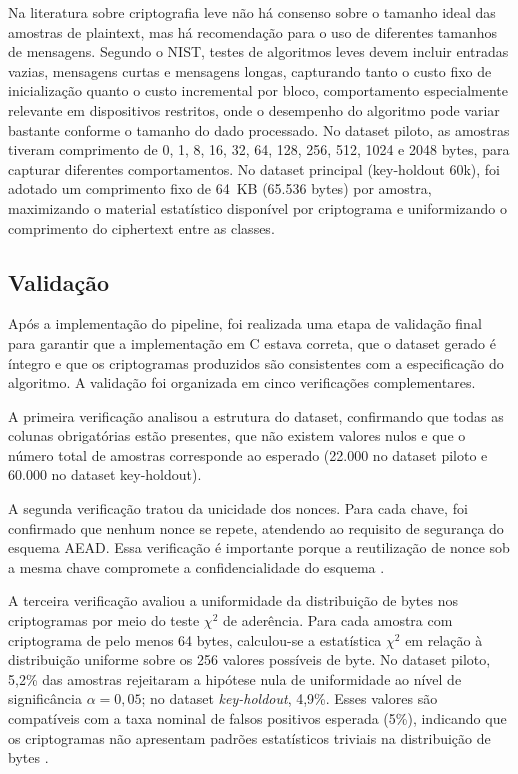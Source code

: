 Na literatura sobre criptografia leve não há consenso sobre o tamanho ideal das amostras de plaintext, mas há recomendação para o uso de diferentes tamanhos de mensagens. Segundo o NIST, testes de algoritmos leves devem incluir entradas vazias, mensagens curtas e mensagens longas, capturando tanto o custo fixo de inicialização quanto o custo incremental por bloco, comportamento especialmente relevante em dispositivos restritos, onde o desempenho do algoritmo pode variar bastante conforme o tamanho do dado processado. No dataset piloto, as amostras tiveram comprimento de 0, 1, 8, 16, 32, 64, 128, 256, 512, 1024 e 2048 bytes, para capturar diferentes comportamentos. No dataset principal (key-holdout 60k), foi adotado um comprimento fixo de 64~KB (65.536 bytes) por amostra, maximizando o material estatístico disponível por criptograma e uniformizando o comprimento do ciphertext entre as classes.
 
\subsection{Validação}
Após a implementação do pipeline, foi realizada uma etapa de validação final para garantir que a implementação em C estava correta, que o dataset gerado é íntegro e que os criptogramas produzidos são consistentes com a especificação do algoritmo. A validação foi organizada em cinco verificações complementares.

A primeira verificação analisou a estrutura do dataset, confirmando que todas as colunas obrigatórias estão presentes, que não existem valores nulos e que o número total de amostras corresponde ao esperado (22.000 no dataset piloto e 60.000 no dataset key-holdout).

A segunda verificação tratou da unicidade dos nonces. Para cada chave, foi confirmado que nenhum nonce se repete, atendendo ao requisito de segurança do esquema AEAD. Essa verificação é importante porque a reutilização de nonce sob a mesma chave compromete a confidencialidade do esquema \cite{nist_sp800232_2025}.

A terceira verificação avaliou a uniformidade da distribuição de bytes nos criptogramas por meio do teste $\chi^2$ de aderência. Para cada amostra com criptograma de pelo menos 64 bytes, calculou-se a estatística $\chi^2$ em relação à distribuição uniforme sobre os 256 valores possíveis de byte. No dataset piloto, 5,2\% das amostras rejeitaram a hipótese nula de uniformidade ao nível de significância $\alpha = 0{,}05$; no dataset \textit{key-holdout}, 4,9\%. Esses valores são compatíveis com a taxa nominal de falsos positivos esperada (5\%), indicando que os criptogramas não apresentam padrões estatísticos triviais na distribuição de bytes \cite{knuth1997}.


